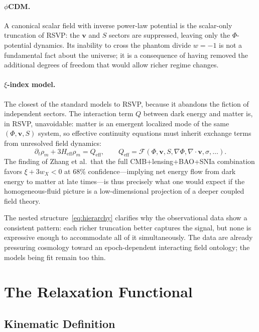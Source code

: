 \documentclass[12pt,a4paper]{article}
\theoremstyle{remark}
\newcommand{\vv}{\mathbf{v}}
\newcommand{\Heff}{H_{\mathrm{eff}}}
\begin{document}
\paragraph{$\phi$CDM.} A canonical scalar field with inverse power-law potential is the scalar-only truncation of RSVP: the $\vv$ and $S$ sectors are suppressed, leaving only the $\Phi$-potential dynamics. Its inability to cross the phantom divide $w = -1$ is not a fundamental fact about the universe; it is a consequence of having removed the additional degrees of freedom that would allow richer regime changes.

\paragraph{$\xi$-index model.} The closest of the standard models to RSVP, because it abandons the fiction of independent sectors. The interaction term $Q$ between dark energy and matter is, in RSVP, unavoidable: matter is an emergent localized mode of the same $(\Phi, \vv, S)$ system, so effective continuity equations must inherit exchange terms from unresolved field dynamics:
\begin{equation}
\partial_t \rho_m + 3\Heff \rho_m = Q_{\mathrm{eff}},
\qquad
Q_{\mathrm{eff}} = \mathcal{F}(\Phi, \vv, S, \nabla\Phi, \nabla\cdot\vv, \sigma, \ldots).
\end{equation}
The finding of Zhang et al.\ that the full CMB+lensing+BAO+SNIa combination favors $\xi + 3w_X < 0$ at 68\% confidence---implying net energy flow from dark energy to matter at late times---is thus precisely what one would expect if the homogeneous-fluid picture is a low-dimensional projection of a deeper coupled field theory.

The nested structure~\eqref{eq:hierarchy} clarifies why the observational data show a consistent pattern: each richer truncation better captures the signal, but none is expressive enough to accommodate all of it simultaneously. The data are already pressuring cosmology toward an epoch-dependent interacting field ontology; the models being fit remain too thin.

\section{The Relaxation Functional}
\label{sec:relaxation}

\subsection{Kinematic Definition}
\end{document}
